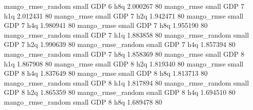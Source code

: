 mango_rmse_random      small      GDP                 6                  h8q 2.000267 80
       mango_rmse      small      GDP                 7                  h1q 2.012431 80
       mango_rmse      small      GDP                 7                  h2q 1.942471 80
       mango_rmse      small      GDP                 7                  h4q 1.980941 80
       mango_rmse      small      GDP                 7                  h8q 1.955190 80
mango_rmse_random      small      GDP                 7                  h1q 1.883858 80
mango_rmse_random      small      GDP                 7                  h2q 1.990639 80
mango_rmse_random      small      GDP                 7                  h4q 1.857394 80
mango_rmse_random      small      GDP                 7                  h8q 1.858369 80
       mango_rmse      small      GDP                 8                  h1q 1.867908 80
       mango_rmse      small      GDP                 8                  h2q 1.819340 80
       mango_rmse      small      GDP                 8                  h4q 1.837649 80
       mango_rmse      small      GDP                 8                  h8q 1.813713 80
mango_rmse_random      small      GDP                 8                  h1q 1.817894 80
mango_rmse_random      small      GDP                 8                  h2q 1.865359 80
mango_rmse_random      small      GDP                 8                  h4q 1.694510 80
mango_rmse_random      small      GDP                 8                  h8q 1.689478 80